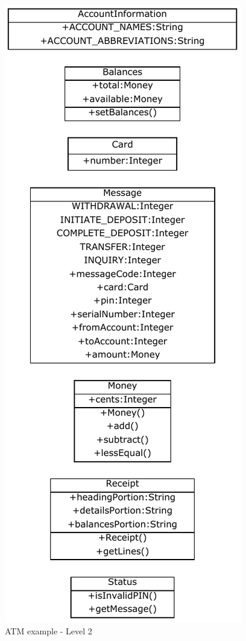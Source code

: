 \begin{figure}[!ht]
\begin{minipage}[b]{0.47\linewidth}
\label{fig:atmBanking1}
\end{minipage}
\quad
\begin{minipage}[b]{0.47\linewidth}
\includegraphics{Figures/Example2a2.pdf}
\caption{ATM example - Level 2}
\label{fig:atmBanking2}
\end{minipage}
\end{figure}

